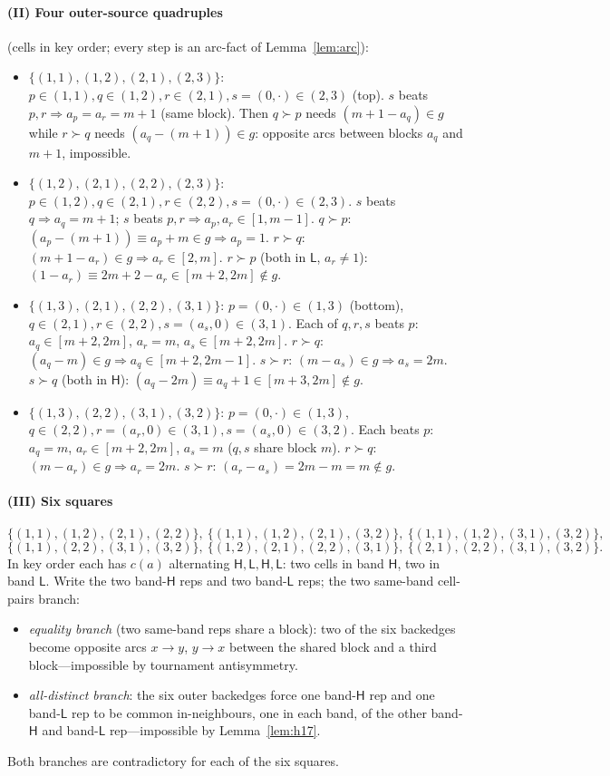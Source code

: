 \documentclass[11pt]{article}
\newcommand{\Hi}{\mathsf{H}}
\newcommand{\Lo}{\mathsf{L}}
\theoremstyle{plain}
\theoremstyle{definition}
\begin{document}
\paragraph{(II) Four outer-source quadruples} (cells in key order; every step is an arc-fact of
Lemma~\ref{lem:arc}):
\begin{itemize}
\item $\{(1,1),(1,2),(2,1),(2,3)\}$: $p\in(1,1),q\in(1,2),r\in(2,1),s=(0,\cdot)\in(2,3)$ (top). $s$
beats $p,r\Rightarrow a_p=a_r=m+1$ (same block). Then $q\succ p$ needs $(m+1-a_q)\in g$ while
$r\succ q$ needs $(a_q-(m+1))\in g$: opposite arcs between blocks $a_q$ and $m+1$, impossible.
\item $\{(1,2),(2,1),(2,2),(2,3)\}$: $p\in(1,2),q\in(2,1),r\in(2,2),s=(0,\cdot)\in(2,3)$. $s$ beats
$q\Rightarrow a_q=m+1$; $s$ beats $p,r\Rightarrow a_p,a_r\in[1,m-1]$. $q\succ p$:
$(a_p-(m+1))\equiv a_p+m\in g\Rightarrow a_p=1$. $r\succ q$: $(m+1-a_r)\in g\Rightarrow a_r\in[2,m]$.
$r\succ p$ (both in $\Lo$, $a_r\ne1$): $(1-a_r)\equiv 2m+2-a_r\in[m+2,2m]\notin g$.
\item $\{(1,3),(2,1),(2,2),(3,1)\}$: $p=(0,\cdot)\in(1,3)$ (bottom), $q\in(2,1),r\in(2,2),s=(a_s,0)
\in(3,1)$. Each of $q,r,s$ beats $p$: $a_q\in[m+2,2m]$, $a_r=m$, $a_s\in[m+2,2m]$. $r\succ q$:
$(a_q-m)\in g\Rightarrow a_q\in[m+2,2m-1]$. $s\succ r$: $(m-a_s)\in g\Rightarrow a_s=2m$. $s\succ q$
(both in $\Hi$): $(a_q-2m)\equiv a_q+1\in[m+3,2m]\notin g$.
\item $\{(1,3),(2,2),(3,1),(3,2)\}$: $p=(0,\cdot)\in(1,3)$, $q\in(2,2),r=(a_r,0)\in(3,1),s=(a_s,0)\in(3,2)$.
Each beats $p$: $a_q=m$, $a_r\in[m+2,2m]$, $a_s=m$ ($q,s$ share block $m$). $r\succ q$:
$(m-a_r)\in g\Rightarrow a_r=2m$. $s\succ r$: $(a_r-a_s)=2m-m=m\notin g$.
\end{itemize}

\paragraph{(III) Six squares}
\[
\{(1,1),(1,2),(2,1),(2,2)\},\ \{(1,1),(1,2),(2,1),(3,2)\},\ \{(1,1),(1,2),(3,1),(3,2)\},
\]
\[
\{(1,1),(2,2),(3,1),(3,2)\},\ \{(1,2),(2,1),(2,2),(3,1)\},\ \{(2,1),(2,2),(3,1),(3,2)\}.
\]
In key order each has $c(a)$ alternating $\Hi,\Lo,\Hi,\Lo$: two cells in band $\Hi$, two in band
$\Lo$. Write the two band-$\Hi$ reps and two band-$\Lo$ reps; the two same-band cell-pairs branch:
\begin{itemize}[nosep]
\item \emph{equality branch} (two same-band reps share a block): two of the six backedges become
opposite arcs $x\to y$, $y\to x$ between the shared block and a third block---impossible by
tournament antisymmetry.
\item \emph{all-distinct branch}: the six outer backedges force one band-$\Hi$ rep and one
band-$\Lo$ rep to be common in-neighbours, one in each band, of the other band-$\Hi$ and band-$\Lo$
rep---impossible by Lemma~\ref{lem:h17}.
\end{itemize}
Both branches are contradictory for each of the six squares.
\end{document}
